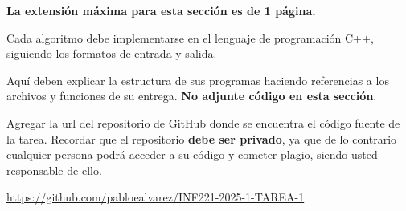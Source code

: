 \begin{mdframed}
    \textbf{La extensión máxima para esta sección es de 1 página.}
\end{mdframed}
\begin{mdframed}
    Cada algoritmo debe implementarse en el lenguaje de programación C++, siguiendo los formatos de entrada y salida.
\end{mdframed}
Aquí deben explicar la estructura de sus programas haciendo referencias a los archivos y funciones de su entrega. \textbf{No adjunte código en esta sección}.

Agregar la url del repositorio de GitHub donde se encuentra el código fuente de la tarea. Recordar que el repositorio \textbf{debe ser privado}, ya que de lo contrario cualquier persona podrá acceder a su código y cometer plagio, siendo usted responsable de ello. 

\begin{mdframed}
    \begin{center}
        {\Large \url{https://github.com/pabloealvarez/INF221-2025-1-TAREA-1}}
    \end{center}
\end{mdframed}